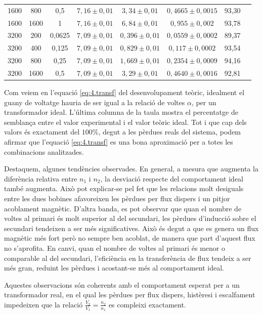 \documentclass[a4paper,10.5pt]{report}
\begin{document}
\begin{table}[h]
\begin{tabular}{lccccccc}
		1600 & 800 & 0{,}5 & $7{,}16 \pm 0{,}01$ & $3{,}34 \pm 0{,}01$ & $0{,}4665 \pm 0{,}0015$ & 93,30  \\
		1600 & 1600 & 1 & $7{,}16 \pm 0{,}01$ & $6{,}84 \pm 0{,}01$ & $0{,}955 \pm 0{,}002$ & 93,78  \\
		\midrule
		3200 & 200 & 0{,}0625 & $7{,}09 \pm 0{,}01$ & $0{,}396 \pm 0{,}01$ & $0{,}0559 \pm 0{,}0002$ & 89,37  \\
		3200 & 400 & 0{,}125 & $7{,}09 \pm 0{,}01$ & $0{,}829 \pm 0{,}01$ & $0{,}117 \pm 0{,}0002$ & 93,54  \\
		3200 & 800 & 0{,}25 & $7{,}09 \pm 0{,}01$ & $1{,}669 \pm 0{,}01$ & $0{,}2354 \pm 0{,}0009$ & 94,16  \\
		3200 & 1600 & 0{,}5 & $7{,}09 \pm 0{,}01$ & $3{,}29 \pm 0{,}01$ & $0{,}4640 \pm 0{,}0016$ & 92,81  \\
		\bottomrule
	\end{tabular}
	\label{tab:4.2}
\end{table}

Com veiem en l'equació \eqref{eq:4.transf} del desenvolupament teòric, idealment el guany de voltatge hauria de ser igual a la relació de voltes $\alpha$, per un transformador ideal. L'última columna de la taula mostra el percentatge de semblança entre el valor experimental i el valor teòric ideal. Tot i que cap dels valors és exactament del $100\%$, degut a les pèrdues reals del sistema, podem afirmar que l'equació \eqref{eq:4.transf} es una bona aproximació per a totes les combinacions analitzades. 

Destaquem,  algunes tendències observades. En general, a mesura que augmenta la diferència relativa entre $n_1$ i $n_2$, la desviació respecte del comportament ideal també augmenta. Això pot explicar-se pel fet que les relacions molt desiguals entre les dues bobines afavoreixen les pèrdues per flux dispers i un pitjor acoblament magnètic. D'altra banda, es pot observar que quan el nombre de voltes al primari és molt superior al del secundari, les pèrdues d'inducció sobre el secundari tendeixen a ser més significatives. Això és degut a que es genera un flux magnètic més fort però no sempre ben acoblat, de manera que part d’aquest flux no s’aprofita. En canvi, quan el nombre de voltes al primari és menor o comparable al del secundari, l’eficiència en la transferència de flux tendeix a ser més gran, reduint les pèrdues i acostant-se més al comportament ideal.

Aquestes observacions són coherents amb el comportament esperat per a un transformador real, en el qual les pèrdues per flux dispers, histèresi i escalfament impedeixen que la relació \( \frac{V_2}{V_1} = \frac{n_2}{n_1} \) es compleixi exactament.
\end{document}
